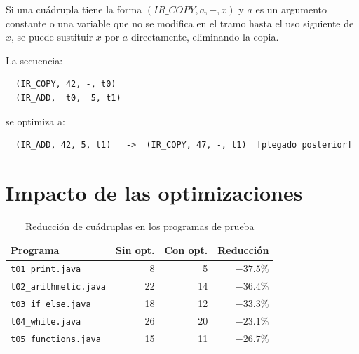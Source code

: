 Si una cuádrupla tiene la forma $(IR\_COPY, a, -, x)$ y $a$ es un
argumento constante o una variable que no se modifica en el tramo
hasta el uso siguiente de $x$, se puede sustituir $x$ por $a$
directamente, eliminando la copia.

\begin{ejemplo}
  La secuencia:
  \begin{verbatim}
  (IR_COPY, 42, -, t0)
  (IR_ADD,  t0,  5, t1)
  \end{verbatim}
  se optimiza a:
  \begin{verbatim}
  (IR_ADD, 42, 5, t1)   ->  (IR_COPY, 47, -, t1)  [plegado posterior]
  \end{verbatim}
\end{ejemplo}

\section{Impacto de las optimizaciones}

\begin{table}[H]
  \centering
  \caption{Reducción de cuádruplas en los programas de prueba}
  \label{tab:opt-impact}
  \begin{tabular}{lrrr}
    \toprule
    \textbf{Programa} & \textbf{Sin opt.} & \textbf{Con opt.} & \textbf{Reducción} \\
    \midrule
    \texttt{t01\_print.java}      & 8  & 5  & $-37.5\%$ \\
    \texttt{t02\_arithmetic.java} & 22 & 14 & $-36.4\%$ \\
    \texttt{t03\_if\_else.java}   & 18 & 12 & $-33.3\%$ \\
    \texttt{t04\_while.java}      & 26 & 20 & $-23.1\%$ \\
    \texttt{t05\_functions.java}  & 15 & 11 & $-26.7\%$ \\
    \bottomrule
  \end{tabular}
\end{table}
